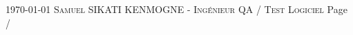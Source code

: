 \documentclass[localFont,alternative,10pt,compact]{yaac-another-awesome-cv}
\begin{document}
	\makecvheader

	\makecvfooter
		{\textsc{\today}}
		{\textsc{Samuel SIKATI KENMOGNE - Ingénieur QA / Test Logiciel}}
		{Page \thepage / \pageref*{LastPage}}

\end{document}
